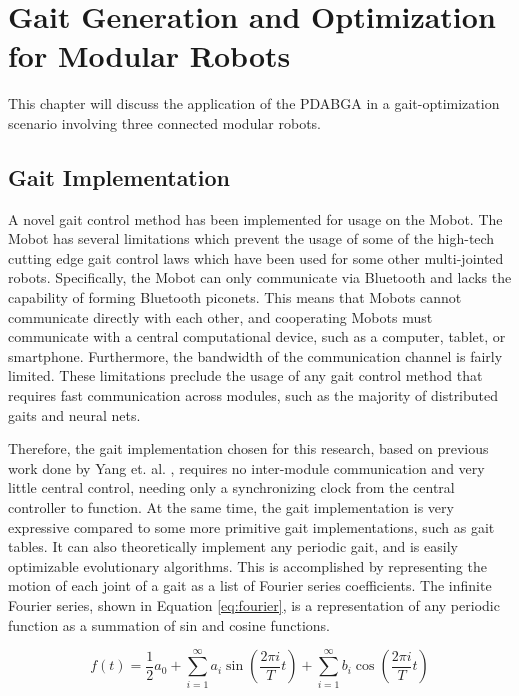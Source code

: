 \chapter{Gait Generation and Optimization for Modular Robots}
  This chapter will discuss the application of the PDABGA in a gait-optimization
    scenario involving three connected modular robots.
  

\section{Gait Implementation}
  A novel gait control method has been implemented for usage on the Mobot.
  The Mobot has several limitations which prevent the usage of some of the
    high-tech cutting edge gait control laws which have been used for some
    other multi-jointed robots. 
  Specifically, the Mobot can only communicate via Bluetooth and lacks the
    capability of forming Bluetooth piconets. 
  This means that Mobots cannot communicate directly with each other, and
    cooperating Mobots must communicate with a central computational device,
    such as a computer, tablet, or smartphone. 
  Furthermore, the bandwidth of the communication channel is fairly limited.
  These limitations preclude the usage of any gait control method that 
    requires fast communication across modules, such as the majority of 
    distributed gaits and neural nets.

  Therefore, the gait implementation chosen for this research, based on
    previous work done by Yang et. al. \cite{Yang2006}, requires no 
    inter-module communication and very little central control, needing
    only a synchronizing clock from the central controller to function.
  At the same time, the gait implementation is very expressive compared to
    some more primitive gait implementations, such as gait tables.
  It can also theoretically implement any periodic gait, and is easily
    optimizable evolutionary algorithms.
  This is accomplished by representing the motion of each joint of a gait 
    as a list of Fourier series coefficients. 
  The infinite Fourier series, shown in Equation \ref{eq:fourier}, is a
    representation of any periodic function as a summation of sin and 
    cosine functions.

  \begin{equation}
  \label{eq:fourier}
  f(t) = \frac{1}{2} a_0 + 
  \sum_{i=1}^{\infty} a_i \sin\left(\frac{2 \pi i}{T}t\right) + 
  \sum_{i=1}^{\infty} b_i \cos\left(\frac{2 \pi i}{T}t\right)
  \end{equation}
  
